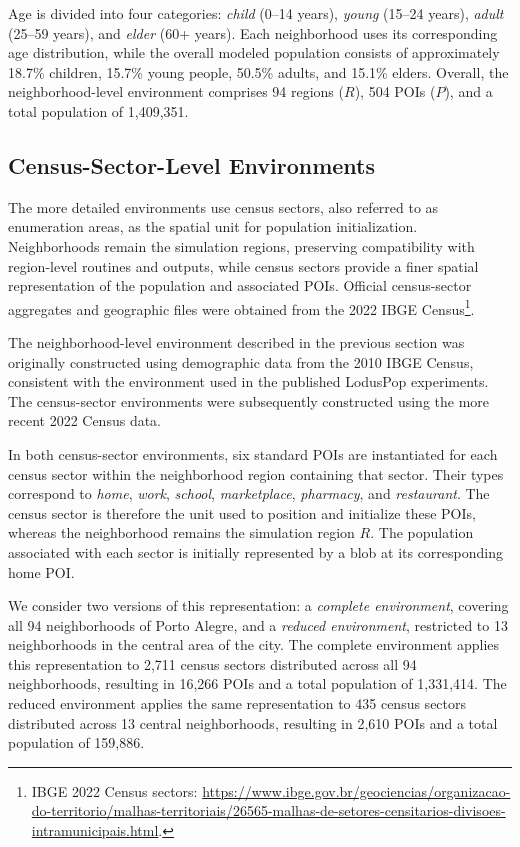 Age is divided into four categories: \textit{child} (0--14 years), \textit{young} (15--24 years), \textit{adult} (25--59 years), and \textit{elder} (60+ years). Each neighborhood uses its corresponding age distribution, while the overall modeled population consists of approximately 18.7\% children, 15.7\% young people, 50.5\% adults, and 15.1\% elders. Overall, the neighborhood-level environment comprises 94 regions ($R$), 504 POIs ($P$), and a total population of 1,409,351.

\subsection{Census-Sector-Level Environments}

The more detailed environments use census sectors, also referred to as enumeration areas, as the spatial unit for population initialization. Neighborhoods remain the simulation regions, preserving compatibility with region-level routines and outputs, while census sectors provide a finer spatial representation of the population and associated POIs. Official census-sector aggregates and geographic files were obtained from the 2022 IBGE Census\footnote{IBGE 2022 Census sectors: \url{https://www.ibge.gov.br/geociencias/organizacao-do-territorio/malhas-territoriais/26565-malhas-de-setores-censitarios-divisoes-intramunicipais.html}.}.

The neighborhood-level environment described in the previous section was originally constructed using demographic data from the 2010 IBGE Census, consistent with the environment used in the published LodusPop experiments. The census-sector environments were subsequently constructed using the more recent 2022 Census data. %


In both census-sector environments, six standard POIs are instantiated for each census sector within the neighborhood region containing that sector. Their types correspond to \textit{home}, \textit{work}, \textit{school}, \textit{marketplace}, \textit{pharmacy}, and \textit{restaurant}. The census sector is therefore the unit used to position and initialize these POIs, whereas the neighborhood remains the simulation region $R$. The population associated with each sector is initially represented by a blob at its corresponding home POI.

We consider two versions of this representation: a \textit{complete environment}, covering all 94 neighborhoods of Porto Alegre, and a \textit{reduced environment}, restricted to 13 neighborhoods in the central area of the city.
The complete environment applies this representation to 2,711 census sectors distributed across all 94 neighborhoods, resulting in 16,266 POIs and a total population of 1,331,414. The reduced environment applies the same representation to 435 census sectors distributed across 13 central neighborhoods, resulting in 2,610 POIs and a total population of 159,886.

